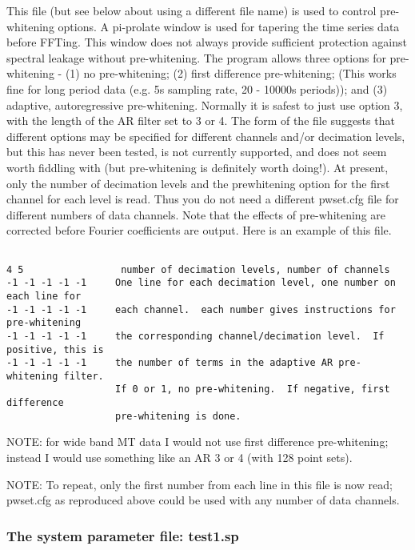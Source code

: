 This file (but see below about using a different
file name) is used to control pre-whitening options.
A pi-prolate window is used for tapering the time series data 
before FFTing.
This window does not always provide
sufficient protection against spectral leakage
without pre-whitening.
The program allows three options for pre-whitening -
(1) no pre-whitening; (2) first difference pre-whitening;
(This works fine for long period data (e.g. 5s sampling rate,
20 - 10000s periods));
and (3) adaptive, autoregressive pre-whitening.
Normally it is safest to just use option 3, with the
length of the AR filter set to 3 or 4.
The form of the file suggests that
different options may be specified for different channels
and/or decimation levels, but this has never been tested,
is not currently supported,
and does not seem worth 
fiddling with (but pre-whitening is definitely worth doing!).
At present, only the number of decimation levels and the
prewhitening option for the first channel for each level is read.
Thus you do not need a different pwset.cfg file for different
numbers of data channels.
Note that the effects of pre-whitening are corrected before
Fourier coefficients are output.
Here is an example of this file.
\small

\begin{verbatim}

4 5                 number of decimation levels, number of channels
-1 -1 -1 -1 -1     One line for each decimation level, one number on each line for
-1 -1 -1 -1 -1     each channel.  each number gives instructions for pre-whitening
-1 -1 -1 -1 -1     the corresponding channel/decimation level.  If positive, this is
-1 -1 -1 -1 -1     the number of terms in the adaptive AR pre-whitening filter.
                   If 0 or 1, no pre-whitening.  If negative, first difference
                   pre-whitening is done.
\end{verbatim}
\normalsize

NOTE: for wide band MT data I would not use first difference pre-whitening;
instead I would use something like an AR 3 or 4 (with 128 point sets).

NOTE: To repeat, only the first number from each line in this file is now
read; pwset.cfg as reproduced above could be used with any number of data
channels.

\subsubsection{The system parameter file: test1.sp}

